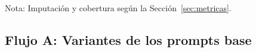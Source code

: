 \begin{table}[!h]
\vspace{1.5ex}
\begin{minipage}{\textwidth}
Nota: Imputación y cobertura según la Sección~\ref{sec:metricas}.
\end{minipage}
\end{table}





\newpage
\clearpage
\subsection{Flujo A: Variantes de los prompts base}

\begin{table}[H]
\centering
\caption{Métricas de las variantes \texttt{\_1} del Flujo A en simetría axial, resolución 224px, iluminación \textit{flat}, envío multiimagen.}
\label{tab:nov_axis_variantes_1}
\footnotesize
\setlength{\tabcolsep}{3pt}
\renewcommand{\arraystretch}{0.95}


\end{table}
